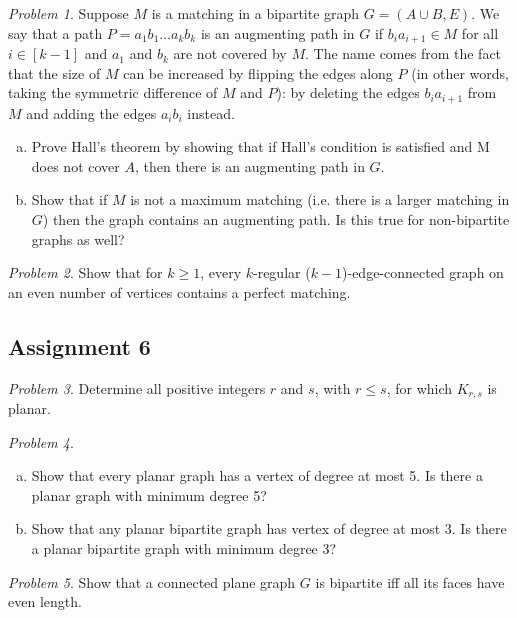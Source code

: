 \documentclass[10pt, fleqn, a4paper, landscape]{article}
\theoremstyle{plain} %
\theoremstyle{remark} %
\newtheorem{problem}{Problem}
\theoremstyle{definition} %
\begin{document}
\begin{multicols}{3}
\begin{tiny}
\begin{problem}
Suppose $M$ is a matching in a bipartite graph $G = (A\cup B,E)$. We say that a path $P = a_1b_1\dots a_kb_k$ is an augmenting path in $G$ if $b_ia_{i+1}\in M$ for all $i\in [k - 1]$ and $a_1$ and $b_k$ are not covered by $M$. The name comes from the fact that the size of $M$ can be increased
by 
flipping the edges along $P$ (in other words, taking the symmetric difference of $M$ and $P$): by deleting the edges $b_ia_{i+1}$ from $M$ and adding the edges $a_ib_i$ instead.
\begin{enumerate}[(a)]
\item Prove Hall's theorem by showing that if Hall's condition is satisfied and M does not cover $A$, then there is an augmenting path in $G$.
\item Show that if $M$ is not a maximum matching (i.e. there is a larger matching in $G$) then the graph contains an augmenting path. Is this true for non-bipartite graphs as well?
\end{enumerate}
\end{problem}

\begin{problem}
Show that for $k\ge 1$, every $k$-regular ($k- 1$)-edge-connected graph on an even number of vertices contains a perfect matching.
\end{problem}

\subsection{Assignment 6}

\begin{problem}
Determine all positive integers $r$ and $s$, with $r \le s$, for which $K_{r,s}$ is planar.
\end{problem}

\begin{problem}
\begin{enumerate}[(a)]
\item Show that every planar graph has a vertex of degree at most 5. Is there a planar graph with minimum degree 5?
\item Show that any planar bipartite graph has vertex of degree at most 3. Is there a planar bipartite graph with minimum degree 3?
\end{enumerate}
\end{problem}

\begin{problem}
Show that a connected plane graph $G$ is bipartite iff all its faces have even length.
\end{problem}


\end{tiny}
\end{multicols}
\end{document}
